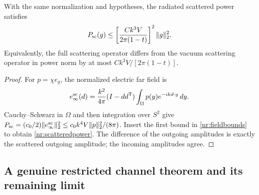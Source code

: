 \begin{proposition}
\label{nr:farfield}
With the same normalization and hypotheses, the radiated scattered power
satisfies
\begin{equation}
 P_{\rm sc}(g)\leq
 \left[\frac{Ck^3V}{2\pi(1-t)}\right]^2\|g\|_2^2.
 \label{nr:scatteredpower}
\end{equation}
Equivalently, the full scattering operator differs from the vacuum scattering
operator in power norm by at most $Ck^3V/[2\pi(1-t)]$.
\end{proposition}
\begin{proof}
For $p=\chi e_g$, the normalized electric far field is
\begin{equation}
 e^{\rm sc}_\infty(d)=\frac{k^2}{4\pi}(I-dd^{\mathsf T})
             \int_\Omega p(y)e^{-ikd\cdot y}\,dy.
 \label{nr:farfieldformula}
\end{equation}
Cauchy--Schwarz in $\Omega$ and then integration over $S^2$ give
$P_{\rm sc}=(c_0/2)\|e^{\rm sc}_\infty\|_2^2
\leq c_0k^4V\|p\|_2^2/(8\pi)$.
Insert the first bound in \eqref{nr:fieldbounds} to obtain
\eqref{nr:scatteredpower}. The difference of the outgoing amplitudes is
exactly the scattered outgoing amplitude; the incoming amplitudes agree.
\end{proof}

\subsection{A genuine restricted channel theorem and its remaining limit}


